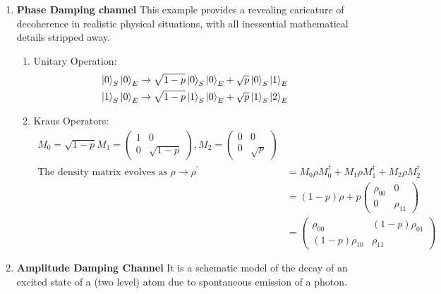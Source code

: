 \begin{enumerate}
    \item \textbf{Phase Damping channel}
    This example provides a revealing caricature of decoherence in realistic physical situations, with all inessential mathematical details stripped away.
    \begin{enumerate}
        \item {Unitary Operation:}
        \begin{equation}
        \begin{aligned}
            \ket{0}_S\ket{0}_E \rightarrow \sqrt{1-p}\ket{0}_S\ket{0}_E + \sqrt{p}\ket{0}_S\ket{1}_E \\
            \ket{1}_S\ket{0}_E \rightarrow \sqrt{1-p}\ket{1}_S\ket{0}_E + \sqrt{p}\ket{1}_S\ket{2}_E
        \end{aligned}
        \end{equation}
        \item {Kraus Operators:}
        \begin{equation}
        \begin{aligned}
            M_0 = \sqrt{1-p}
            M_1 = \begin{pmatrix}
1 & 0\\
0 & \sqrt{1-p}
\end{pmatrix}, M_2 = \begin{pmatrix}
0 & 0\\
0 & \sqrt{p}
\end{pmatrix} \\
\text{The density matrix evolves as } \rho \rightarrow \rho^{'} &= M_0\rho M_0^{\dagger} + M_1\rho M_1^{\dagger} + M_2\rho M_2^{\dagger} \\
& = (1-p)\rho + p\begin{pmatrix}
\rho_{00} & 0\\
0 & \rho_{11}
\end{pmatrix} \\
& = \begin{pmatrix}
\rho_{00} & (1-p)\rho_{01}\\
(1-p)\rho_{10} & \rho_{11}
\end{pmatrix}
        \end{aligned}
        \end{equation}
    \end{enumerate}
    \item \textbf{Amplitude Damping Channel}
    It is a schematic model of the decay of an excited state of a (two level) atom due to spontaneous emission of a photon.
    \begin{enumerate}

\end{enumerate}
\end{enumerate}
